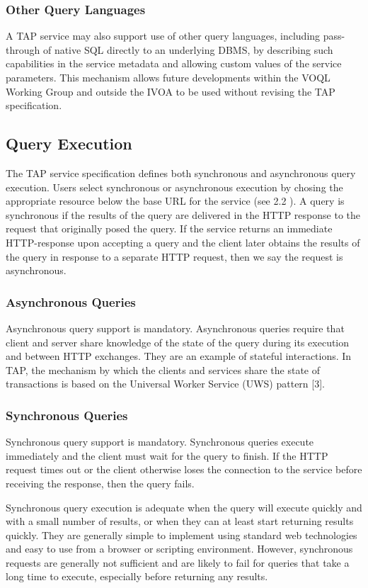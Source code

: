\documentclass[11pt,a4paper]{ivoa}
\begin{document}
\subsubsection{Other Query Languages}
A TAP service may also support use of other query languages, including 
pass-through of native SQL directly to an underlying DBMS, by describing such 
capabilities in the service metadata and allowing custom values of the service 
parameters. This mechanism allows future developments within the VOQL Working 
Group and outside the IVOA to be used without revising the TAP specification.

\subsection{Query Execution}
The TAP service specification defines both synchronous and asynchronous query 
execution. Users select synchronous or asynchronous execution by chosing the 
appropriate resource below the base URL for the service (see 2.2 ). A query is 
synchronous if the results of the query are delivered in the HTTP response to 
the request that originally posed the query. If the service returns an immediate 
HTTP-response upon accepting a query and the client later obtains the results of 
the query in response to a separate HTTP request, then we say the request is 
asynchronous.

\subsubsection{Asynchronous Queries}
Asynchronous query support is mandatory. Asynchronous queries require that 
client and server share knowledge of the state of the query during its execution 
and between HTTP exchanges.  They are an example of stateful interactions.  In 
TAP, the mechanism by which the clients and services share the state of 
transactions is based on the Universal Worker Service (UWS) pattern [3].

\subsubsection{Synchronous Queries}
Synchronous query support is mandatory. Synchronous queries execute immediately 
and the client must wait for the query to finish.  If the HTTP request times out 
or the client otherwise loses the connection to the service before receiving the 
response, then the query fails.

Synchronous query execution is adequate when the query will execute quickly and 
with a small number of results, or when they can at least start returning 
results quickly. They are generally simple to implement using standard web 
technologies and easy to use from a browser or scripting environment. However, 
synchronous requests are generally not sufficient and are likely to fail for 
queries that take a long time to execute, especially before returning any 
results.
\end{document}
